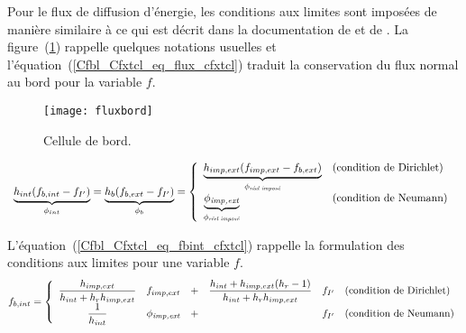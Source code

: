 Pour le flux de diffusion d'\'energie, les conditions aux limites sont
impos\'ees de mani\`ere similaire \`a ce qui est d\'ecrit dans
la documentation de  et de
. La figure~(\ref{Cfbl_Cfxtcl_fig_flux_cfxtcl}) rappelle quelques notations
usuelles et l'\'equation~(\ref{Cfbl_Cfxtcl_eq_flux_cfxtcl}) traduit la conservation du flux
normal au bord pour la variable $f$.

\begin{figure}[htp]
\centerline{\texttt{[image: fluxbord]}}
\caption{\label{Cfbl_Cfxtcl_fig_flux_cfxtcl}Cellule de bord.}
\end{figure}

\begin{equation}\label{Cfbl_Cfxtcl_eq_flux_cfxtcl}
\begin{array}{l}
    \underbrace{h_{int}(f_{b,int}-f_{I'})}_{\phi_{int}}
  = \underbrace{h_{b}(f_{b,ext}-f_{I'})}_{\phi_{b}}
  = \left\{\begin{array}{ll}
    \underbrace{h_{imp,ext}(f_{imp,ext}-f_{b,ext})}_{\phi_{\text{\it r\'eel
impos\'e}}} &\text{(condition de Dirichlet)}\\
    \underbrace{\phi_{\text{\it imp,ext}}}_{\phi_{\text{\it r\'eel impos\'e}}}
            &\text{(condition de Neumann)}
           \end{array}\right.
\end{array}
\end{equation}


L'\'equation~(\ref{Cfbl_Cfxtcl_eq_fbint_cfxtcl}) rappelle la formulation des
conditions aux limites pour une variable $f$.
\begin{equation}\label{Cfbl_Cfxtcl_eq_fbint_cfxtcl}
f_{b,int}
  = \left\{\begin{array}{cccccl}
    \displaystyle\frac{h_{imp,ext}}{h_{int}+h_r h_{imp,ext} }&f_{imp,ext}&+&
    \displaystyle\frac{h_{int}+h_{imp,ext}(h_r-1)}{h_{int}+h_r h_{imp,ext} }&f_{I'}
                         &\text{(condition de Dirichlet)}\\
    \displaystyle\frac{1}{h_{int}}&\phi_{\text{\it imp,ext}}&+&
    \ &f_{I'}
            &\text{(condition de Neumann)}
           \end{array}\right.
\end{equation}

